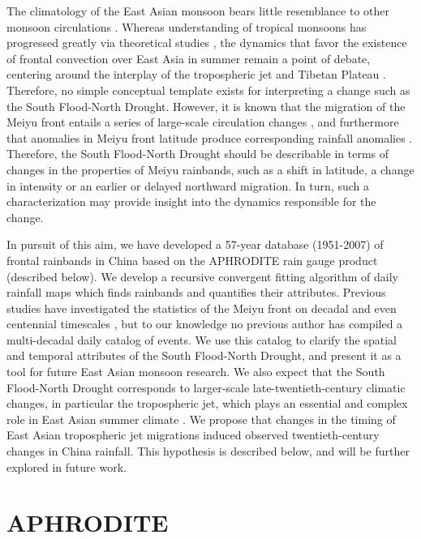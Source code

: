 	The climatology of the East Asian monsoon bears little resemblance to other monsoon circulations \citep{Ding2005}. Whereas understanding of tropical monsoons has progressed greatly via theoretical studies \citep{Plumb1992,Prive2007,Bordoni2008}, the dynamics that favor the existence of frontal convection over East Asia in summer remain a point of debate, centering around the interplay of the tropospheric jet and Tibetan Plateau \citep{Molnar2010,Sampe2010,Chen2014}. Therefore, no simple conceptual template exists for interpreting a change such as the South Flood-North Drought. However, it is known that the migration of the Meiyu front entails a series of large-scale circulation changes \citep{Chen2004}, and furthermore that anomalies in Meiyu front latitude produce corresponding rainfall anomalies \citep{Kosaka2011}. Therefore, the South Flood-North Drought should be describable in terms of changes in the properties of Meiyu rainbands, such as a shift in latitude, a change in intensity or an earlier or delayed northward migration. In turn, such a characterization may provide insight into the dynamics responsible for the change.
	
	In pursuit of this aim, we have developed a 57-year database (1951-2007) of frontal rainbands in China based on the APHRODITE rain gauge product (described below). We develop a recursive convergent fitting algorithm of daily rainfall maps which finds rainbands and quantifies their attributes. Previous studies have investigated the statistics of the Meiyu front on decadal and even centennial timescales \citep{Chen2004,Ge2008,Xu2009}, but to our knowledge no previous author has compiled a multi-decadal daily catalog of events. We use this catalog to clarify the spatial and temporal attributes of the South Flood-North Drought, and present it as a tool for future East Asian monsoon research. We also expect that the South Flood-North Drought corresponds to larger-scale late-twentieth-century climatic changes, in particular the tropospheric jet, which plays an essential and complex role in East Asian summer climate \citep{Molnar2010}. We propose that changes in the timing of East Asian tropospheric jet migrations induced observed twentieth-century changes in China rainfall. This hypothesis is described below, and will be further explored in future work.

\section{APHRODITE}

